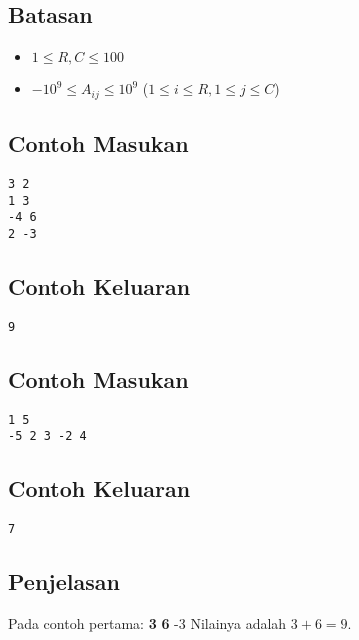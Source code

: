 \documentclass{article}
\begin{document}
\subsection*{Batasan}

\begin{itemize}
    \setlength\itemsep{0pt}
    \item $1 \leq R, C \leq 100$
    \item $-10^9 \leq A_{ij} \leq 10^9$ ($1 \leq i \leq R, 1 \leq j \leq C$)
\end{itemize}
\begin{multicols}{2}
\subsection*{Contoh Masukan}
\begin{lstlisting}
3 2
1 3
-4 6
2 -3
\end{lstlisting}
\columnbreak
\subsection*{Contoh Keluaran}
\begin{lstlisting}
9
\end{lstlisting}
\vfill
\null
\end{multicols}

\begin{multicols}{2}
\subsection*{Contoh Masukan}
\begin{lstlisting}
1 5
-5 2 3 -2 4
\end{lstlisting}
\columnbreak
\subsection*{Contoh Keluaran}
\begin{lstlisting}
7
\end{lstlisting}
\vfill
\null
\end{multicols}
\subsection*{Penjelasan}
Pada contoh pertama:
 \textbf{3}
 \textbf{6}
 -3
\newline
Nilainya adalah $3+6 = 9$.

\pagebreak
\end{document}
